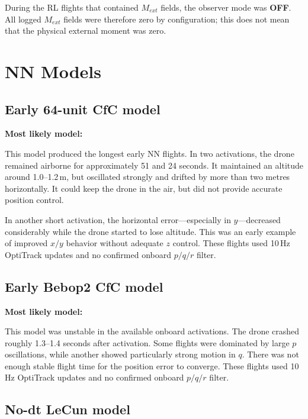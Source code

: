 \documentclass[11pt,a4paper]{article}
\begin{document}
During the RL flights that contained $M_{ext}$ fields, the observer mode was \textbf{OFF}. All logged $M_{ext}$ fields were therefore zero by configuration; this does not mean that the physical external moment was zero.

\section{NN Models}

\subsection{Early 64-unit CfC model}

\textbf{Most likely model:} 

This model produced the longest early NN flights. In two activations, the drone remained airborne for approximately 51 and 24 seconds. It maintained an altitude around 1.0--1.2\,m, but oscillated strongly and drifted by more than two metres horizontally. It could keep the drone in the air, but did not provide accurate position control.

In another short activation, the horizontal error---especially in $y$---decreased considerably while the drone started to lose altitude. This was an early example of improved $x/y$ behavior without adequate $z$ control. These flights used 10\,Hz OptiTrack updates and no confirmed onboard $p/q/r$ filter.

\subsection{Early Bebop2 CfC model}

\textbf{Most likely model:} 

This model was unstable in the available onboard activations. The drone crashed roughly 1.3--1.4 seconds after activation. Some flights were dominated by large $p$ oscillations, while another showed particularly strong motion in $q$. There was not enough stable flight time for the position error to converge. These flights used 10\,Hz OptiTrack updates and no confirmed onboard $p/q/r$ filter.

\subsection{No-dt LeCun model}
\end{document}
